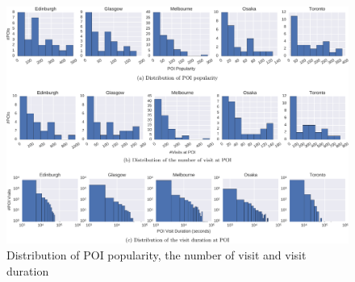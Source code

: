 \begin{figure}[t]
\includegraphics[width=\textwidth]{fig/feature_distro.pdf}
\caption{Distribution of POI popularity, the number of visit and visit duration}
\label{fig:distro}\captionmoveup
\end{figure}
